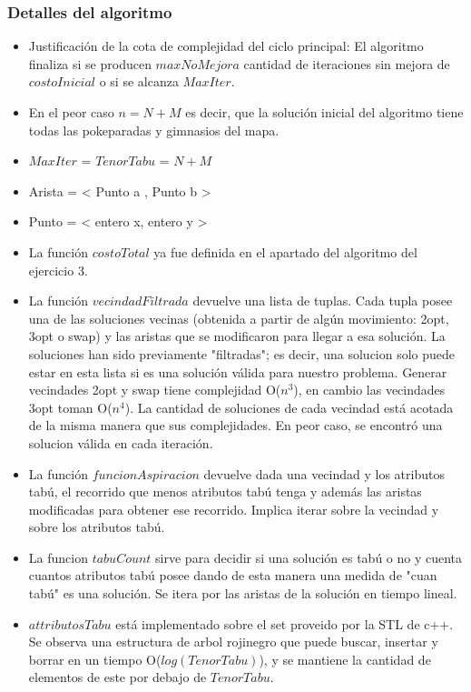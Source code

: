 \subsubsection*{Detalles del algoritmo}

\begin{itemize}
\item Justificación de la cota de complejidad del ciclo principal: El algoritmo finaliza si se producen $maxNoMejora$ cantidad de iteraciones sin mejora de $costoInicial$ o si se alcanza $MaxIter$. 
\item En el peor caso $n = N+M$ es decir, que la solución inicial del algoritmo tiene todas las pokeparadas y gimnasios del mapa.
\item $MaxIter$ = $TenorTabu$ = $N+M$
\item Arista = < Punto a , Punto b >
\item Punto = < entero x, entero y >
\item La función $costoTotal$ ya fue definida en el apartado del algoritmo del ejercicio 3.
\item La función $vecindadFiltrada$ devuelve una lista de tuplas. Cada tupla posee una de las soluciones vecinas (obtenida a partir de algún movimiento: 2opt, 3opt o swap) y las aristas que se modificaron para llegar a esa solución. La soluciones han sido previamente "filtradas"; es decir, una solucion solo puede estar en esta lista si es una solución válida para nuestro problema. Generar vecindades 2opt y swap tiene complejidad O($n^3$), en cambio las vecindades 3opt toman O($n^4$).
	La cantidad de soluciones de cada vecindad está acotada de la misma manera que sus complejidades. En peor caso, se encontró una solucion válida en cada iteraci\'on.
\item La función $funcionAspiracion$ devuelve dada una vecindad y los atributos tabú, el recorrido que menos atributos tabú tenga y además las aristas modificadas para obtener ese recorrido. Implica iterar sobre la vecindad y sobre los atributos tabú. 
\item La funcion $tabuCount$ sirve para decidir si una solución es tabú o no y cuenta cuantos atributos tabú posee dando de esta manera una medida de "cuan tabú" es una solución. Se itera por las aristas de la solución en tiempo lineal.
\item $attributosTabu$ está implementado sobre el set proveido por la STL de c++. Se observa una estructura de arbol rojinegro que puede buscar, insertar y borrar en un tiempo O($log(TenorTabu)$), y se mantiene la cantidad de elementos de este por debajo de $TenorTabu$.
\end{itemize}
